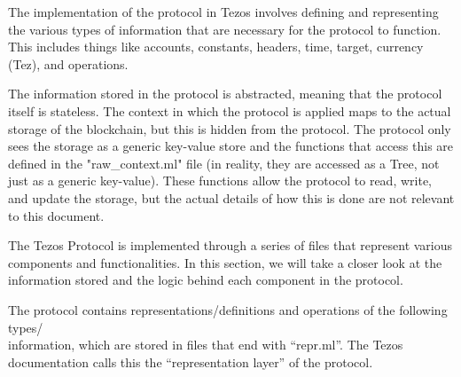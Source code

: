 The implementation of the protocol in Tezos involves defining and representing the various types of information that are necessary for the protocol to function. This includes things like accounts, constants, headers, time, target, currency (Tez), and operations.

The information stored in the protocol is abstracted, meaning that the protocol itself is stateless. The context in which the protocol is applied maps to the actual storage of the blockchain, but this is hidden from the protocol. The protocol only sees the storage as a generic key-value store and the functions that access this are defined in the "raw\_context.ml" file (in reality, they are accessed as a Tree, not just as a generic key-value). These functions allow the protocol to read, write, and update the storage, but the actual details of how this is done are not relevant to this document.


The Tezos Protocol is implemented through a series of files that represent various components and functionalities. In this section, we will take a closer look at the information stored and the logic behind each component in the protocol.

The protocol contains representations/definitions and operations of the following types/\\information, which are stored in files that end with ``repr.ml''. The Tezos documentation calls this the ``representation layer'' of the protocol.


